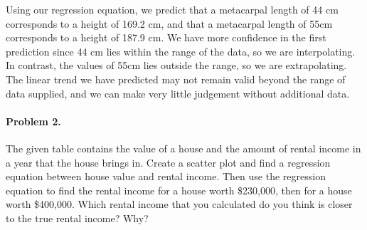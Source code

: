\documentclass[10pt]{article}
\begin{document}
        Using our regression equation, we predict that a metacarpal length of 44 cm corresponds to a height of 169.2 cm,
        and that a metacarpal length of 55cm corresponds to a height of 187.9 cm.
        We have more confidence in the first prediction since 44 cm lies within the range of the data, so we are interpolating.
        In contrast, the values of 55cm lies outside the range, so we are extrapolating. The linear trend we have predicted may not remain valid
        beyond the range of data supplied, and we can make very little judgement without additional data.

        \paragraph{Problem 2.} The given table contains the value of a house and the amount of rental income in a year that the house brings in.
        Create a scatter plot and find a regression equation between house value and rental income. Then use the regression equation to find
        the rental income for a house worth \$230,000, then for a house worth \$400,000. 
        Which rental income that you calculated do you think is closer to the true rental income? Why? \\
        
\end{document}
